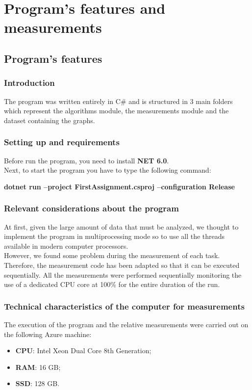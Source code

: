 \section{Program's features and measurements}

\subsection{Program's features}

\subsubsection{Introduction}
The program was written entirely in C\# and is structured in 3 main folders which represent the algorithms module, the measurements module and the dataset containing the graphs.

\subsubsection{Setting up and requirements}
Before run the program, you need to install \textbf{NET 6.0}.\\
Next, to start the program you have to type the following command:\\
\centerline{\textbf{dotnet run --project FirstAssignment.csproj --configuration Release}}\newline{}

\subsubsection{Relevant considerations about the program}
At first, given the large amount of data that must be analyzed, we thought to implement the program in multiprocessing mode so to use all the threads available in modern computer processors. \\
\noindent
However, we found some problem during the measurement of each task.
Therefore, the measurement code has been adapted so that it can be executed sequentially.
All the measurements were performed sequentially monitoring the use of a dedicated CPU core at 100\% for the entire duration of the run.

\subsubsection{Technical characteristics of the computer for measurements}
The execution of the program and the relative measurements were carried out on the following Azure machine:
\begin{itemize}
    \item \textbf{CPU}: Intel Xeon Dual Core 8th Generation;
    \item \textbf{RAM}: 16 GB;
    \item \textbf{SSD}: 128 GB.
\end{itemize}

